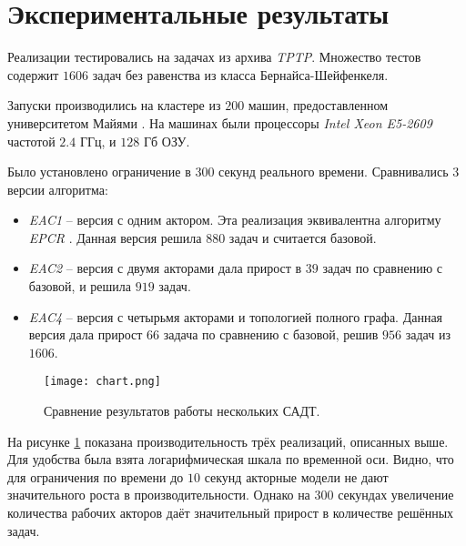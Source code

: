 \section{Экспериментальные результаты}

Реализации тестировались на задачах из архива \emph{TPTP}. Множество тестов содержит $1606$ задач без равенства из класса Бернайса-Шейфенкеля. 

Запуски производились на кластере из $200$ машин, предоставленном университетом Майями \cite{StarExec}. На машинах были процессоры \emph{Intel Xeon E5-2609} частотой $2.4$ ГГц, и $128$ Гб ОЗУ.

Было установлено ограничение в $300$ секунд реального времени. Сравнивались $3$ версии алгоритма:
\begin{itemize}[label=*]
	\item \emph{EAC1} -- версия с одним актором. Эта реализация эквивалентна алгоритму \emph{EPCR} \cite{DBLP:journals/corr/ItegulovSP17}. Данная версия решила $880$ задач и считается базовой.
    \item \emph{EAC2} -- версия с двумя акторами дала прирост в $39$ задач по сравнению с базовой, и решила $919$ задач.
    \item \emph{EAC4} -- версия с четырьмя акторами и топологией полного графа. Данная версия дала прирост $66$ задача по сравнению с базовой, решив $956$ задач из $1606$.
\end{itemize}


\begin{figure}[!h]
\centering
\texttt{[image: chart.png]}
\caption{Сравнение результатов работы нескольких САДТ.}\label{fig:chart}
\end{figure}

На рисунке \ref{fig:chart} показана производительность трёх реализаций, описанных выше. Для удобства была взята логарифмическая шкала по временной оси. Видно, что для ограничения по времени до $10$ секунд акторные модели не дают значительного роста в производительности. Однако на $300$ секундах увеличение количества рабочих акторов даёт значительный прирост в количестве решённых задач.

